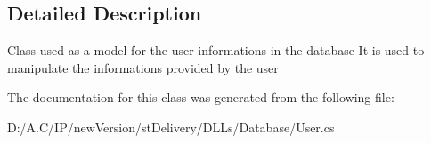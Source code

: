 \subsection{Detailed Description}
Class used as a model for the user informations in the database It is used to manipulate the informations provided by the user 



The documentation for this class was generated from the following file\+:\begin{DoxyCompactItemize}
\item 
D\+:/\+A.\+C/\+I\+P/new\+Version/st\+Delivery/\+D\+L\+Ls/\+Database/User.\+cs\end{DoxyCompactItemize}
